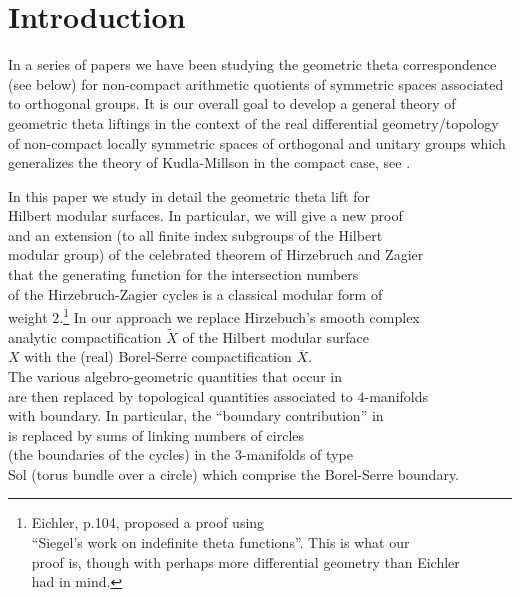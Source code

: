 \section{Introduction}

In a series of papers \cite{FM1,FMcoeff,FMres,FMspec} we have been studying the geometric theta correspondence (see below) for non-compact arithmetic quotients of symmetric spaces associated to orthogonal groups. It is our overall goal to develop a general theory of geometric theta liftings in the context of the real differential geometry/topology of non-compact locally symmetric spaces of orthogonal and unitary groups which generalizes the theory of Kudla-Millson in the compact case, see \cite{KM90}. 

In this paper we study in detail the geometric theta lift for \\
Hilbert modular surfaces. In particular, we will give a new proof \\
and an extension (to all finite index subgroups of the Hilbert \\
modular group) of the celebrated theorem of Hirzebruch and Zagier\\
\cite{HZ} that the generating function for the intersection numbers\\
of the Hirzebruch-Zagier cycles is a classical modular form of \\
weight $2$.\footnote{Eichler, \cite{HZ} p.104, proposed a proof using \\
``Siegel's work on indefinite theta functions''. This is what our \\
proof is, though with perhaps more differential geometry than Eichler \\
had in mind.} In our approach we replace Hirzebuch's smooth complex \\
analytic compactification $\tilde{X}$ of the Hilbert modular surface \\
$X$ with the (real) Borel-Serre compactification $\overline{X}$. \\
The various algebro-geometric quantities that occur in \cite{HZ} \\
are then replaced by topological quantities associated to $4$-manifolds \\
with boundary. In particular, the ``boundary contribution'' in \\
\cite{HZ} is replaced by sums of linking numbers of circles \\
(the boundaries of the cycles) in the $3$-manifolds of type \\
Sol (torus bundle over a circle) which comprise the Borel-Serre boundary.\\